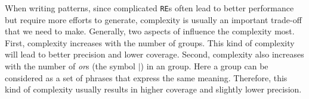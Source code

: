 When writing \RE patterns, since complicated \texttt{RE}s often lead to better performance but require more efforts to generate, \RE complexity is usually an important trade-off that we need to make. Generally, two aspects of \RE influence the complexity most. First, \RE complexity increases with the number of \RE groups. This kind of complexity will lead to better precision and lower coverage. Second, \RE complexity also increases with the number of \emph{or}s (the symbol $|$) in an \RE group. Here a group can be considered as a set of phrases that express the same meaning. Therefore, this kind of complexity usually results in higher coverage and slightly lower precision.

